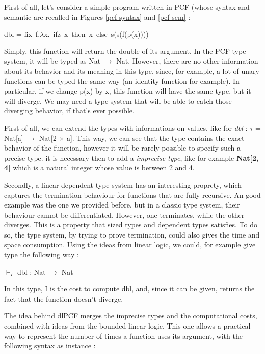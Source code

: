 \documentclass[a4paper,12pt]{report}
\begin{document}
First of all, let's consider a simple program written in PCF (whose syntax and
semantic are recalled in Figures \ref{pcf-syntax} and \ref{pcf-sem} :

\begin{center} 
  dbl = fix~f.$\lambda $x.~ifz~x~then~x~else~s(s(f(p(x)))) 
\end{center}

Simply, this function will return the double of its argument. In the PCF type
system, it will be typed as Nat $\rightarrow$ Nat. However, there are no other
information about its behavior and its meaning in this type, since, for example,
a lot of unary functions can be typed the same way (an identity function for
example). In particular, if we change p(x) by x, this function will have the
same type, but it will diverge. We may need a type system that will be able to
catch those diverging behavior, if that's ever possible.

First of all, we can extend the types with informations on values, like for
\emph{dbl} : $\tau$ = Nat[a] $\rightarrow$ Nat[2 $\times$ a]. This way, we can
see that the type contains the exact behavior of the function, however it will
be rarely possible to specify such a precise type. it is necessary then to add a
\emph{imprecise type}, like for example \textbf{Nat[2, 4]} which is a natural
integer whose value is between 2 and 4.

\medskip

Secondly, a linear dependent type system has an interesting proprety, which
captures the termination behaviour for functions that are fully recursive. An
good example was the one we provided before, but in a classic type system, their
behaviour cannot be differentiated. However, one terminates, while the other
diverges. This is a property that sized types and dependent types satisfies. To
do so, the type system, by trying to prove termination, could also gives the
time and space consumption. Using the ideas from linear logic, we could, for
example give type the following way :

\begin{center}
$\vdash_{I}$ dbl : Nat $\rightarrow$ Nat
\end{center}

In this type, I is the cost to compute dbl, and, since it can be given, returns
the fact that the function doesn't diverge.

The idea behind dlPCF merges the imprecise types and the computational costs,
combined with ideas from the bounded linear logic. This one allows a practical
way to represent the number of times a function uses its argument, with the
following syntax as instance :
\end{document}
